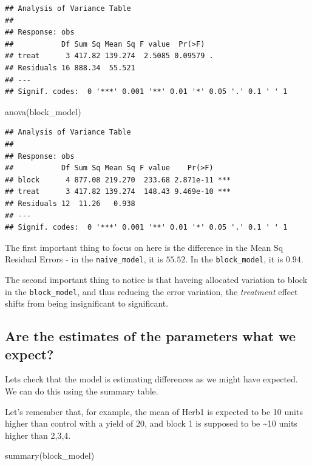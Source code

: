 \documentclass[
]{book}
\newenvironment{Shaded}{\begin{snugshade}}{\end{snugshade}}
\newcommand{\FunctionTok}[1]{\textcolor[rgb]{0.00,0.00,0.00}{#1}}
\newcommand{\NormalTok}[1]{#1}
\begin{document}
\begin{verbatim}
## Analysis of Variance Table
## 
## Response: obs
##           Df Sum Sq Mean Sq F value  Pr(>F)  
## treat      3 417.82 139.274  2.5085 0.09579 .
## Residuals 16 888.34  55.521                  
## ---
## Signif. codes:  0 '***' 0.001 '**' 0.01 '*' 0.05 '.' 0.1 ' ' 1
\end{verbatim}

\begin{Shaded}
\begin{Highlighting}[]
\FunctionTok{anova}\NormalTok{(block\_model)}
\end{Highlighting}
\end{Shaded}

\begin{verbatim}
## Analysis of Variance Table
## 
## Response: obs
##           Df Sum Sq Mean Sq F value    Pr(>F)    
## block      4 877.08 219.270  233.68 2.871e-11 ***
## treat      3 417.82 139.274  148.43 9.469e-10 ***
## Residuals 12  11.26   0.938                      
## ---
## Signif. codes:  0 '***' 0.001 '**' 0.01 '*' 0.05 '.' 0.1 ' ' 1
\end{verbatim}

The first important thing to focus on here is the difference in the Mean Sq Residual Errors - in the \texttt{naive\_model}, it is \(55.52\). In the \texttt{block\_model}, it is \(0.94\).

The second important thing to notice is that haveing allocated variation to block in the \texttt{block\_model}, and thus reducing the error variation, the \emph{treatment} effect shifts from being insignificant to significant.

\hypertarget{are-the-estimates-of-the-parameters-what-we-expect}{%
\subsection{Are the estimates of the parameters what we expect?}\label{are-the-estimates-of-the-parameters-what-we-expect}}

Lets check that the model is estimating differences as we might have expected. We can do this using the summary table.

Let's remember that, for example, the mean of Herb1 is expected to be 10 units higher than control with a yield of 20, and block 1 is supposed to be \textasciitilde10 units higher than 2,3,4.

\begin{Shaded}
\begin{Highlighting}[]
\FunctionTok{summary}\NormalTok{(block\_model)}
\end{Highlighting}
\end{Shaded}
\end{document}
